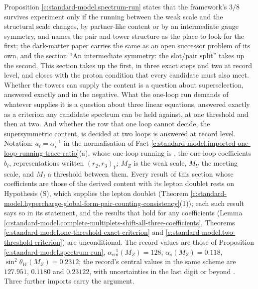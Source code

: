 \documentclass[11pt]{article}
\theoremstyle{definition}
\theoremstyle{plain}
\begin{document}
\label{c:note.standard-model.setting-partner-sector-quantified}
Proposition \ref{c:standard-model.spectrum-run} states that the framework's $3/8$ survives experiment only if the running between the weak scale and the structural scale changes, by partner-like content or by an intermediate gauge symmetry, and names the pair and tower structure as the place to look for the first; the dark-matter paper carries the same as an open successor problem of its own, and the section ``An intermediate symmetry: the slot/pair split'' takes up the second. This section takes up the first, in three exact steps and two at record level, and closes with the proton condition that every candidate must also meet. Whether the towers can supply the content is a question about superselection, answered exactly and in the negative. What the one-loop run demands of whatever supplies it is a question about three linear equations, answered exactly as a criterion any candidate spectrum can be held against, at one threshold and then at two. And whether the row that one loop cannot decide, the supersymmetric content, is decided at two loops is answered at record level. Notation: $a_{i} = \alpha_{i}^{-1}$ in the normalisation of Fact \ref{c:standard-model.imported-one-loop-running-trace-ratio}(a), whose one-loop running is \cite{GeorgiQuinnWeinberg1974}, the one-loop coefficients $b_{i}$, representations written $(r_{2}, r_{3})_{Y}$; $M_{Z}$ is the weak scale, $M_{U}$ the meeting scale, and $M_{I}$ a threshold between them. Every result of this section whose coefficients are those of the derived content with its lepton doublet rests on Hypothesis (S), which supplies the lepton doublet (Theorem \ref{c:standard-model.hypercharge-global-form-pair-counting-consistency}(1)); each such result says so in its statement, and the results that hold for any coefficients (Lemma \ref{c:standard-model.complete-multiplets-shift-all-three-coefficients}, Theorems \ref{c:standard-model.one-threshold-exact-criterion} and \ref{c:standard-model.two-threshold-criterion}) are unconditional. The record values are those of Proposition \ref{c:standard-model.spectrum-run}, $\alpha_{\mathrm{em}}^{-1}(M_{Z}) = 128$, $\alpha_{s}(M_{Z}) = 0.118$, $\sin^{2}\theta_{W}(M_{Z}) = 0.2312$; the record's central values in the same scheme are $127.951$, $0.1180$ and $0.23122$, with uncertainties in the last digit or beyond \cite{PDG2024}. Three further imports carry the argument.
\end{document}

